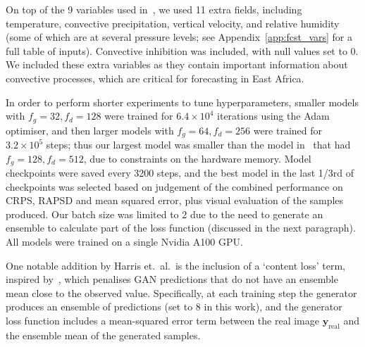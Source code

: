 \documentclass{article}
\begin{document}
 On top of the 9 variables used in~\cite{harris_generative_2022}, we used 11 extra fields, including temperature, convective precipitation, vertical velocity, and relative humidity (some of which are at several pressure levels; see Appendix~\ref{app:fcst_vars} for a full table of inputs). Convective inhibition was included, with null values set to 0. We included these extra variables as they contain important information about convective processes, which are critical for forecasting in East Africa. 

 In order to perform shorter experiments to tune hyperparameters, smaller models with $f_g=32, f_d=128$ were trained for $6.4\times 10^4$ iterations using the Adam optimiser, and then larger models with $f_g=64, f_d=256$ were trained for $3.2\times10^5$ steps; thus our largest model was smaller than the model in~\cite{harris_generative_2022} that had $f_g=128, f_d=512$, due to constraints on the hardware memory. Model checkpoints were saved every 3200 steps, and the best model in the last 1/3rd of checkpoints was selected based on judgement of the combined performance on CRPS, RAPSD and mean squared error, plus visual evaluation of the samples produced. Our batch size was limited to 2 due to the need to generate an ensemble to calculate part of the loss function (discussed in the next paragraph). All models were trained on a single Nvidia A100 GPU.

One notable addition by Harris et.~al.~is the inclusion of a `content loss' term, inspired by~\cite{ravuri_skilful_2021}, which penalises GAN predictions that do not have an ensemble mean close to the observed value. Specifically, at each training step the generator produces an ensemble of predictions (set to 8 in this work), and the generator loss function includes a mean-squared error term between the real image $\mathbf{y}_{\text{real}}$ and the ensemble mean of the generated samples.

\end{document}
